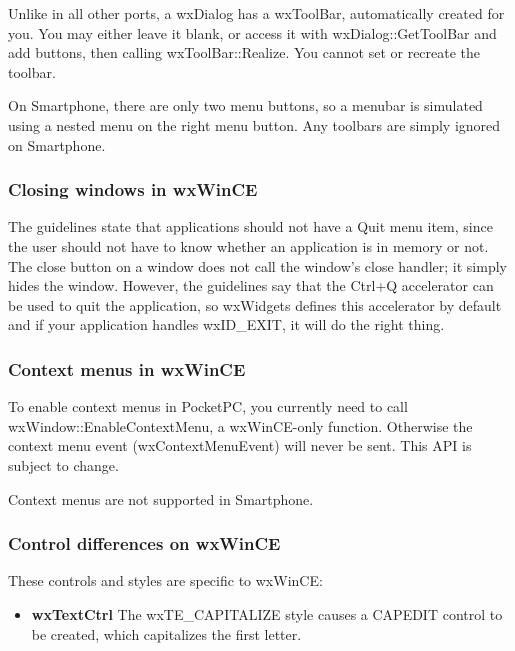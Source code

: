 Unlike in all other ports, a wxDialog has a wxToolBar, automatically created
for you. You may either leave it blank, or access it with wxDialog::GetToolBar
and add buttons, then calling wxToolBar::Realize. You cannot set or recreate
the toolbar.


On Smartphone, there are only two menu buttons, so a menubar is simulated
using a nested menu on the right menu button. Any toolbars are simply ignored on
Smartphone.

\subsubsection{Closing windows in wxWinCE}

The guidelines state that applications should not have a Quit menu item,
since the user should not have to know whether an application is in memory
or not. The close button on a window does not call the window's
close handler; it simply hides the window. However, the guidelines say that
the Ctrl+Q accelerator can be used to quit the application, so wxWidgets
defines this accelerator by default and if your application handles
wxID\_EXIT, it will do the right thing.

\subsubsection{Context menus in wxWinCE}

To enable context menus in PocketPC, you currently need to call wxWindow::EnableContextMenu,
a wxWinCE-only function. Otherwise the context menu event (wxContextMenuEvent) will
never be sent. This API is subject to change.

Context menus are not supported in Smartphone.

\subsubsection{Control differences on wxWinCE}

These controls and styles are specific to wxWinCE:

\itemsep=0pt
\begin{itemize}
\item {\bf wxTextCtrl} The wxTE\_CAPITALIZE style causes a CAPEDIT control to
be created, which capitalizes the first letter.
\end{itemize}

